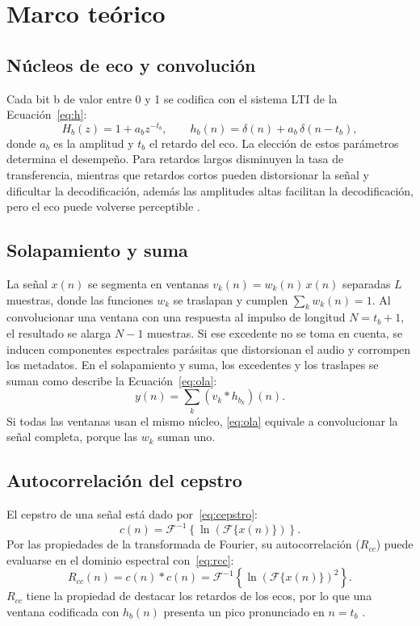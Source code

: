 \documentclass[journal]{IEEEtran}
\begin{document}

\section{Marco teórico}\label{sec:teoria}

\subsection{Núcleos de eco y convolución}
Cada bit b de valor entre 0 y 1 se codifica con el sistema LTI de la Ecuación~\eqref{eq:h}:
\begin{equation}\label{eq:h}
H_b(z)=1+a_b z^{-t_b},\qquad h_b(n)=\delta(n)+a_b\,\delta(n-t_b),
\end{equation}
donde $a_b$ es la amplitud y $t_b$ el retardo del eco. La elección de estos
parámetros determina el desempeño. Para retardos largos disminuyen la tasa de
transferencia, mientras que retardos cortos pueden distorsionar la señal y
dificultar la decodificación, además las amplitudes altas facilitan la decodificación,
pero el eco puede volverse perceptible \cite{gruhl1996echo}.

\subsection{Solapamiento y suma}
La señal $x(n)$ se segmenta en ventanas $v_k(n)=w_k(n)\,x(n)$ separadas $L$
muestras, donde las funciones $w_k$ se traslapan y cumplen
$\sum_k w_k(n)=1$. Al convolucionar una ventana con una respuesta al impulso de
longitud $N=t_b+1$, el resultado se alarga $N-1$ muestras. Si ese excedente no
se toma en cuenta, se inducen componentes espectrales parásitas que distorsionan
el audio y corrompen los metadatos. En el solapamiento y suma, los excedentes y
los traslapes se suman como describe la Ecuación~\eqref{eq:ola}:
\begin{equation}\label{eq:ola}
y(n)=\sum_{k}\left(v_k*h_{b_k}\right)(n).
\end{equation}
Si todas las ventanas usan el mismo núcleo, \eqref{eq:ola} equivale a convolucionar
la señal completa, porque las $w_k$ suman uno.


\subsection{Autocorrelación del cepstro}
El cepstro de una señal está dado por~\eqref{eq:cepstro}:
\begin{equation}\label{eq:cepstro}
c(n)=\mathcal{F}^{-1}\left\{\ln\left(\mathcal{F}\{x(n)\}\right)\right\}.
\end{equation}
Por las propiedades de la transformada de Fourier, su autocorrelación ($R_{cc}$) puede
evaluarse en el dominio espectral con~\eqref{eq:rcc}:
\begin{equation}\label{eq:rcc}
R_{cc}(n)=c(n)*c(n)=\mathcal{F}^{-1}\left\{\ln\left(\mathcal{F}\{x(n)\}\right)^2\right\}.
\end{equation}
$R_{cc}$ tiene la propiedad de destacar los retardos de los ecos, por lo que una
ventana codificada con $h_b(n)$ presenta un pico pronunciado en $n=t_b$
\cite{gruhl1996echo}.
\end{document}
